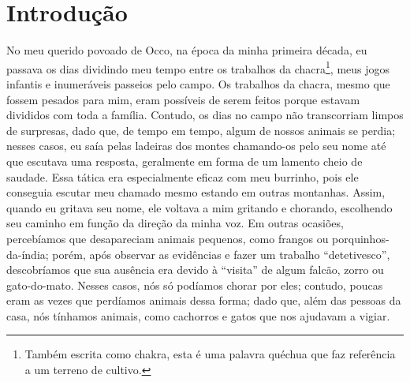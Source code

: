 \cleardoublepage
\newpage
\ifdefined\EnableIncludeImages
\fi
\chapter*{Introdução} %

No meu querido povoado de Occo, na época da minha primeira década, eu passava os dias dividindo meu tempo entre os trabalhos da chacra\footnote{Também escrita como chakra, esta é uma palavra quéchua que faz referência a um terreno de cultivo.}, meus jogos infantis e inumeráveis passeios pelo campo.
Os trabalhos da chacra, mesmo que fossem pesados para mim, eram possíveis de serem feitos porque estavam divididos com toda a família.
Contudo, os dias no campo não transcorriam limpos de surpresas, dado que, de tempo em tempo, algum de nossos animais se perdia; nesses casos, eu saía pelas ladeiras dos montes chamando-os pelo seu nome até que escutava uma resposta, geralmente em forma de um lamento cheio de saudade.
Essa tática era especialmente eficaz com meu burrinho, pois ele conseguia escutar meu chamado mesmo estando em outras montanhas. Assim, quando eu gritava seu nome, ele voltava a mim gritando e chorando, escolhendo seu caminho em função da direção da minha voz.
Em outras ocasiões, percebíamos que desapareciam animais pequenos, como frangos ou porquinhos-da-índia; porém, após observar as evidências e fazer um trabalho ``detetivesco'', descobríamos que sua ausência era devido à ``visita'' de algum falcão, zorro ou gato-do-mato.
Nesses casos, nós só podíamos chorar por eles; contudo, poucas eram as vezes que perdíamos animais dessa forma; dado que, além das pessoas da casa, nós tínhamos animais, como cachorros e gatos que nos ajudavam a vigiar.

